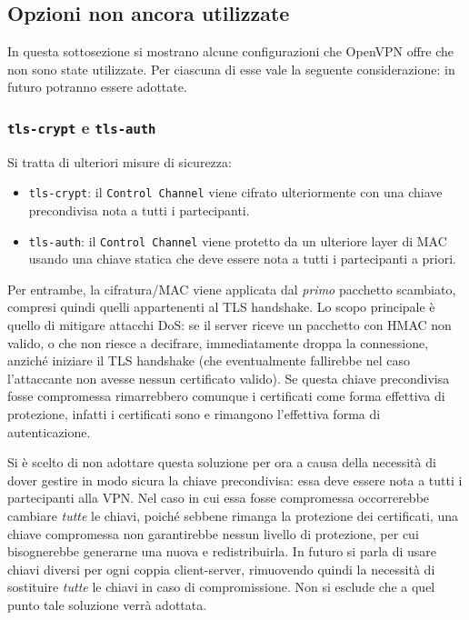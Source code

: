 \subsection{Opzioni non ancora utilizzate}
In questa sottosezione si mostrano alcune configurazioni che OpenVPN offre che
non sono state utilizzate. Per ciascuna di esse vale la seguente considerazione:
in futuro potranno essere adottate.

\subsubsection{\texttt{tls-crypt} e \texttt{tls-auth}} Si tratta di ulteriori
misure di sicurezza:
\begin{itemize}
  \item \texttt{tls-crypt}: il \texttt{Control Channel} viene cifrato ulteriormente
  con una chiave precondivisa nota a tutti i partecipanti.
  \item \texttt{tls-auth}: il \texttt{Control Channel} viene protetto da un ulteriore
  layer di MAC usando una chiave statica che deve essere nota a tutti i partecipanti a priori.
\end{itemize}
Per entrambe, la cifratura/MAC viene applicata dal \textit{primo} pacchetto scambiato, compresi
quindi quelli appartenenti al TLS handshake.
Lo scopo principale è quello di mitigare attacchi DoS: se il server riceve un pacchetto con HMAC non valido,
  o che non riesce a decifrare, immediatamente droppa la connessione, anziché iniziare
  il TLS handshake (che eventualmente fallirebbe nel caso l'attaccante non avesse
  nessun certificato valido).
Se questa chiave precondivisa fosse compromessa rimarrebbero comunque i certificati
come forma effettiva di protezione, infatti i certificati sono e rimangono
l'effettiva forma di autenticazione.

Si è scelto di non adottare questa soluzione per ora a causa della necessità di dover gestire
in modo sicura la chiave precondivisa: essa deve essere nota a tutti i partecipanti
alla VPN. Nel caso in cui essa fosse compromessa occorrerebbe cambiare \textit{tutte}
le chiavi, poiché sebbene rimanga la protezione dei certificati, una chiave
compromessa non garantirebbe nessun livello di protezione, per cui bisognerebbe
generarne una nuova e redistribuirla.
In futuro si parla di usare
chiavi diversi per ogni coppia client-server, rimuovendo quindi la necessità di sostituire
\textit{tutte} le chiavi in caso di compromissione.
Non si esclude che a quel punto tale soluzione verrà adottata.

